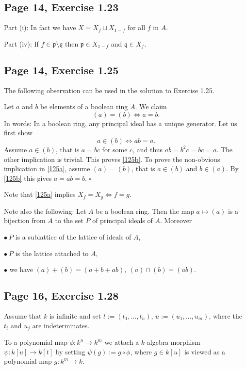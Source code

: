 \documentclass[parskip=half,fontsize=12pt]{scrartcl}%
\newcommand{\mf}{\mathfrak}
\newcommand{\ppp}{\mf p}
\newcommand{\qqq}{\mf q}
\begin{document}
\subsection{Page 14, Exercise 1.23}%

Part (i): In fact we have $X=X_f\sqcup X_{1-f}$ for all $f$ in $A$.

Part (iv): If $f\in\ppp\setminus\qqq$ then $\ppp\in X_{1-f}$ and $\qqq\in X_f$.

\subsection{Page 14, Exercise 1.25}%

The following observation can be used in the solution to Exercise 1.25.

Let $a$ and $b$ be elements of a boolean ring $A$. We claim
\begin{equation}\label{125a}
(a)=(b)\iff a=b.
\end{equation} 
In words: In a boolean ring, any principal ideal has a unique generator. Let us first show 
\begin{equation}\label{125b}
a\in(b)\iff ab=a.
\end{equation}
Assume $a\in(b)$, that is $a=bc$ for some $c$, and thus $ab=b^2c=bc=a$. The other implication is trivial. This proves \eqref{125b}. To prove the non-obvious implication in \eqref{125a}, assume $(a)=(b)$, that is $a\in(b)$ and $b\in(a)$. By \eqref{125b} this gives $a=ab=b$. $\square$

Note that \eqref{125a} implies $X_f=X_g\iff f=g$.

Note also the following: Let $A$ be a boolean ring. Then the map $a\mapsto(a)$ is a bijection from $A$ to the set $P$ of principal ideals of $A$. Moreover 

$\bullet\ P$ is a sublattice of the lattice of ideals of $A$, 

$\bullet\  P$ is the lattice attached to $A$,

$\bullet$ we have $(a)+(b)=(a+b+ab),\ (a)\cap(b)=(ab)$. 

\subsection{Page 16, Exercise 1.28}%

Assume that $k$ is infinite and set $t:=(t_1,\dots,t_n)$, $u:=(u_1,\dots,u_m)$, where the $t_i$ and $u_j$ are indeterminates. 

To a polynomial map $\phi:k^n\to k^m$ we attach a $k$-algebra morphism $\psi:k[u]\to k[t]$ by setting $\psi(g):=g\circ\phi$, where $g\in k[u]$ is viewed as a polynomial map $g:k^m\to k$. 
\end{document}
